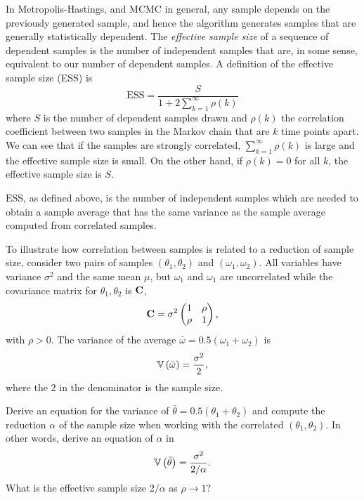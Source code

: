 \begin{exenumerate}
\item In Metropolis-Hastings, and MCMC in general, any sample depends
  on the previously generated sample, and hence the algorithm
  generates samples that are generally statistically dependent. The
  \textit{effective sample size} of a sequence of dependent samples is
  the number of independent samples that are, in some sense,
  equivalent to our number of dependent samples. A definition of the
  effective sample size (ESS) is
  \begin{equation}
    \text{ESS} = \frac{S}{1+ 2\sum_{k=1}^{\infty} \rho(k)}
  \end{equation}
  where $S$ is the number of dependent samples drawn and $\rho(k)$ the
  correlation coefficient between two samples in the Markov chain that
  are $k$ time points apart. We can see that if the samples are
  strongly correlated, $\sum_{k=1}^{\infty} \rho(k)$ is large and the
  effective sample size is small. On the other hand, if $\rho(k)=0$
  for all $k$, the effective sample size is $S$.

$\text{ESS}$, as defined above, is the number of independent
samples which are needed to obtain a sample average that has the same
variance as the sample average computed from correlated samples.

To illustrate how correlation between samples is related to a
reduction of sample size, consider two pairs of samples $(\theta_1,
\theta_2)$ and $(\omega_1, \omega_2)$. All variables have variance
$\sigma^2$ and the same mean $\mu$, but $\omega_1$ and $\omega_1$ are
uncorrelated while the covariance matrix for $\theta_1, \theta_2$ is
$\mathbf{C}$,
\begin{equation}
  \mathbf{C} = \sigma^2 \begin{pmatrix}
    1 & \rho \\
    \rho & 1
  \end{pmatrix},
\end{equation}
with $\rho>0$. The variance of the average $\bar{\omega} = 0.5
(\omega_1+\omega_2)$ is
\begin{equation}
  \mathbb{V} \left( \bar{\omega} \right) = \frac{\sigma^2}{2},
\end{equation}
where the $2$ in the denominator is the sample size.

Derive an equation for the variance of $\bar{\theta} =
0.5(\theta_1+\theta_2)$ and compute the reduction $\alpha$ of the
sample size when working with the correlated $(\theta_1,\theta_2)$. In
other words, derive an equation of $\alpha$ in
\begin{equation}
   \mathbb{V} \left(\bar{\theta}\right) = \frac{\sigma^2}{2/\alpha}.
\end{equation}
What is the effective sample size $2/\alpha$ as $\rho \to 1$?


\end{exenumerate}
